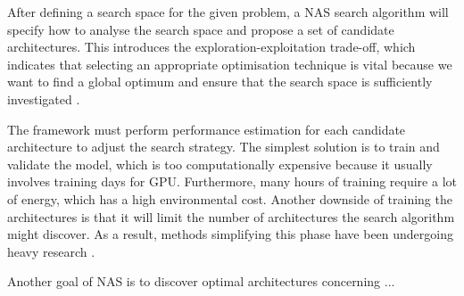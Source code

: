After defining a search space for the given problem, a \gls{NAS} search algorithm will specify how to analyse the search space and propose a set of candidate architectures. This introduces the exploration-exploitation trade-off, which indicates that selecting an appropriate optimisation technique is vital because we want to find a global optimum and ensure that the search space is sufficiently investigated \autocite{kyriakides2020introduction}. 

The framework must perform performance estimation for each candidate architecture to adjust the search strategy. The simplest solution is to train and validate the model, which is too computationally expensive because it usually involves training days for \gls{GPU}. Furthermore, many hours of training require a lot of energy, which has a high environmental cost. Another downside of training the architectures is that it will limit the number of architectures the search algorithm might discover. As a result, methods simplifying this phase have been undergoing heavy research \autocite{elsken2019neural}. 

Another goal of NAS is to discover optimal architectures concerning ...




